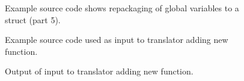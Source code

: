 \begin{figure}[!h]
{\indent
{\mySmallestFontSize


\begin{latexonly}
   
\end{latexonly}

\begin{htmlonly}
%   
\end{htmlonly}

}
}
\caption{Example source code shows repackaging of global variables to a struct (part 5).}
\label{Tutorial:exampleGlobalVariableHandling5}
\end{figure}

\begin{figure}[!h]
{\indent
{\mySmallFontSize


\begin{latexonly}
   
\end{latexonly}

\begin{htmlonly}
   
\end{htmlonly}

}
}
\caption{Example source code used as input to translator adding new function.}
\label{Tutorial:exampleInputCode_AddFunctionDeclaration}
\end{figure}

\begin{figure}[!h]
{\indent
{\mySmallFontSize


\begin{latexonly}
   
\end{latexonly}

\begin{htmlonly}
   
\end{htmlonly}

}
}
\caption{Output of input to translator adding new function.}
\label{Tutorial:exampleOutput_AddFunctionDeclaration}
\end{figure}


